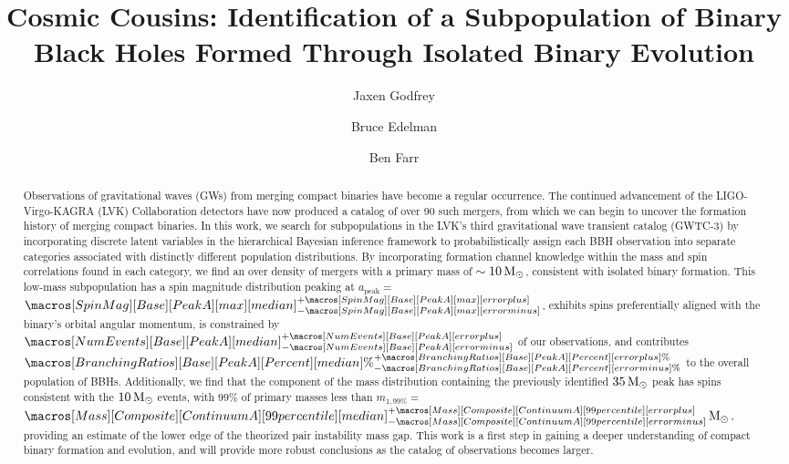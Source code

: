 \documentclass[twocolumn]{aastex631}
\newcommand{\CIPlusMinus}[1]{{#1[median]^{+#1[error plus]}_{-#1[error minus]}}}
\newcommand{\CIPlusMinusPer}[1]{{#1[median]\%^{+#1[error plus]\%}_{-#1[error minus]\%}}}
\newcommand{\msun}{\ensuremath{{\,\rm M}_\odot}}
\newcommand{\result}[1]{\textcolor{red}{#1}}
\begin{document}
\title{Cosmic Cousins: Identification of a Subpopulation of Binary Black Holes Formed Through Isolated Binary Evolution}

\author{Jaxen Godfrey}
\author{Bruce Edelman}
\author{Ben Farr}

\begin{abstract}
    Observations of gravitational waves (GWs) from merging compact binaries have become a regular occurrence. The continued advancement of the LIGO-Virgo-KAGRA (LVK) Collaboration detectors have now produced a catalog of over 90 such mergers, from which we can begin to uncover the formation history of merging compact binaries. In this work, we search for subpopulations in the LVK's third gravitational wave transient catalog (GWTC-3) by incorporating discrete latent variables in the hierarchical Bayesian inference framework to probabilistically assign each BBH observation into separate categories associated with distinctly different population distributions. By incorporating formation channel knowledge within the mass and spin correlations found in each category, we find an over density of mergers with a primary mass of $\sim10\msun$, consistent with isolated binary formation. This low-mass subpopulation has a spin magnitude distribution peaking at $a_\mathrm{peak}=$ \result{$\CIPlusMinus{\macros[SpinMag][Base][PeakA][max]}$}, exhibits spins preferentially aligned with the binary's orbital angular momentum, is constrained by \result{$\CIPlusMinus{\macros[NumEvents][Base][PeakA]}$} of our observations, and contributes \result{$\CIPlusMinusPer{\macros[BranchingRatios][Base][PeakA][Percent]}$} to the overall population of BBHs. Additionally, we find that the component of the mass distribution containing the previously identified $35\msun$ peak has spins consistent with the $10\msun$ events, with $99\%$ of primary masses less than $m_{1,99\%} = $ \result{$\CIPlusMinus{\macros[Mass][Composite][ContinuumA][99percentile]}\msun$}, providing an estimate of the lower edge of the theorized pair instability mass gap. This work is a first step in gaining a deeper understanding of compact binary formation and evolution, and will provide more robust conclusions as the catalog of observations becomes larger. 
\end{abstract}
\end{document}
